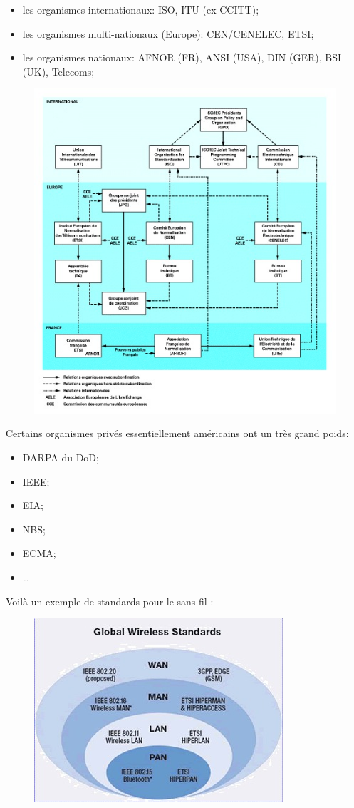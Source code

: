 \begin{itemize}
	\item les organismes internationaux: ISO, ITU (ex-CCITT);
	\item les organismes multi-nationaux (Europe): CEN/CENELEC, ETSI;
	\item les organismes nationaux: AFNOR (FR), ANSI (USA), DIN (GER), BSI (UK), Telecoms;
\end{itemize}
\begin{figure}[H]
	\centering
	\includegraphics{partie1/normalisation.jpg}
\end{figure}
Certains organismes privés essentiellement américains ont un très grand poids:
\begin{itemize}
	\item DARPA du DoD;
	\item IEEE;
	\item EIA;
	\item NBS;
	\item ECMA;
	\item \ldots
\end{itemize}

Voilà un exemple de standards pour le sans-fil :
\begin{figure}[H]
	\centering
	\includegraphics{partie1/standardsexemple.jpg}
\end{figure}



